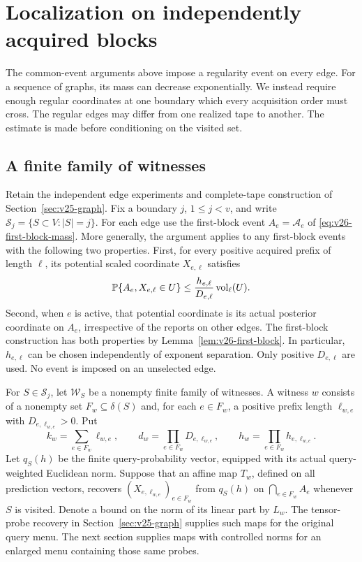 \section{Localization on independently acquired blocks}
\label{sec:v28-localization}
The common-event arguments above impose a regularity event on every
edge. For a sequence of graphs, its mass can decrease exponentially.
We instead require enough regular coordinates at one boundary which
every acquisition order must cross. The regular edges may differ from
one realized tape to another. The estimate is made before conditioning
on the visited set.

\subsection{A finite family of witnesses}
Retain the independent edge experiments and complete-tape construction
of Section~\ref{sec:v25-graph}. Fix a boundary $j$, $1\le j<v$, and
write $\mathscr S_j=\{S\subset V:|S|=j\}$. For each edge use the
first-block event $A_e=\mathcal A_e$ of
\eqref{eq:v26-first-block-mass}. More generally, the argument applies
to any first-block events with the following two properties. First,
for every positive acquired prefix of length $\ell$, its potential
scaled coordinate $X_{e,\ell}$ satisfies
\begin{equation}\label{eq:v28-edge-density}
 \mathbb P\{A_e,X_{e,\ell}\in U\}
       \le \frac{h_{e,\ell}}{D_{e,\ell}}
                          \operatorname{vol}_{\ell}(U).
\end{equation}
Second, when $e$ is active, that potential coordinate is its actual
posterior coordinate on $A_e$, irrespective of the reports on other
edges. The first-block construction has both properties by
Lemma~\ref{lem:v26-first-block}. In particular, $h_{e,\ell}$ can be
chosen independently of exponent separation. Only positive
$D_{e,\ell}$ are used. No event is imposed on an unselected edge.

For $S\in\mathscr S_j$, let $\mathscr W_S$ be a nonempty finite
family of witnesses. A witness $w$ consists of a nonempty set
$F_w\subseteq\delta(S)$ and, for each $e\in F_w$, a positive
prefix length $\ell_{w,e}$ with $D_{e,\ell_{w,e}}>0$. Put
\[
 k_w=\sum_{e\in F_w}\ell_{w,e},\qquad
 d_w=\prod_{e\in F_w}D_{e,\ell_{w,e}},\qquad
 h_w=\prod_{e\in F_w}h_{e,\ell_{w,e}}.
\]
Let $q_S(h)$ be the finite query-probability vector, equipped with
its actual query-weighted Euclidean norm. Suppose that an affine map
$T_w$, defined on all prediction vectors, recovers
$(X_{e,\ell_{w,e}})_{e\in F_w}$ from $q_S(h)$ on
$\bigcap_{e\in F_w}A_e$ whenever $S$ is visited. Denote a bound on
the norm of its linear part by $L_w$. The tensor-probe recovery in
Section~\ref{sec:v25-graph} supplies such maps for the original
query menu. The next section supplies maps with controlled norms for
an enlarged menu containing those same probes.

